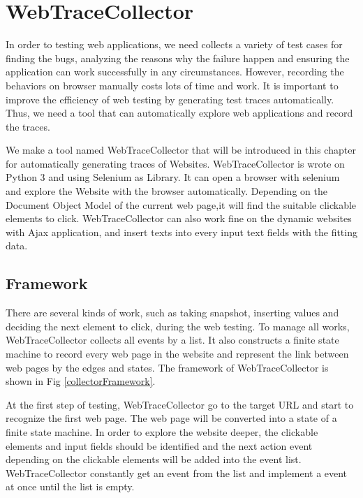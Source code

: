 
\chapter{WebTraceCollector}\label{ch:traceCollector}

In order to testing web applications,
we need collects a variety of test cases 
for finding the bugs, analyzing the reasons why the failure happen 
and ensuring the application can work successfully in any circumstances.
However, recording the behaviors on browser manually costs lots of time and work.
It is important to improve the efficiency of web testing by generating test traces automatically.
Thus, we need a tool that can automatically explore web applications and record the traces.

We make a tool named WebTraceCollector that will be introduced in this chapter for automatically generating traces of Websites.
WebTraceCollector is wrote on Python 3 and using Selenium as Library.
It can open a browser with selenium and explore the Website with the browser automatically.
Depending on the Document Object Model\cite{DOM} of the current web page,it will find the suitable clickable elements to click.
WebTraceCollector can also work fine on the dynamic websites with Ajax\cite{ajax} application,
and insert texts into every input text fields with the fitting data.


\clearpage

\section{Framework}

There are several kinds of work,
such as taking snapshot, inserting values and deciding the next element to click, during the web testing.
To manage all works, WebTraceCollector collects all events by a list.
It also constructs a finite state machine to record every web page in the website 
and represent the link between web pages by the edges and states.
The framework of WebTraceCollector is shown in Fig \ref{collectorFramework}.

At the first step of testing, WebTraceCollector go to the target URL and start to recognize the first web page.
The web page will be converted into a state of a finite state machine.
In order to explore the website deeper,
the clickable elements and input fields should be identified and 
the next action event depending on the clickable elements will be added into the event list.
WebTraceCollector constantly get an event from the list
and implement a event at once until the list is empty.

